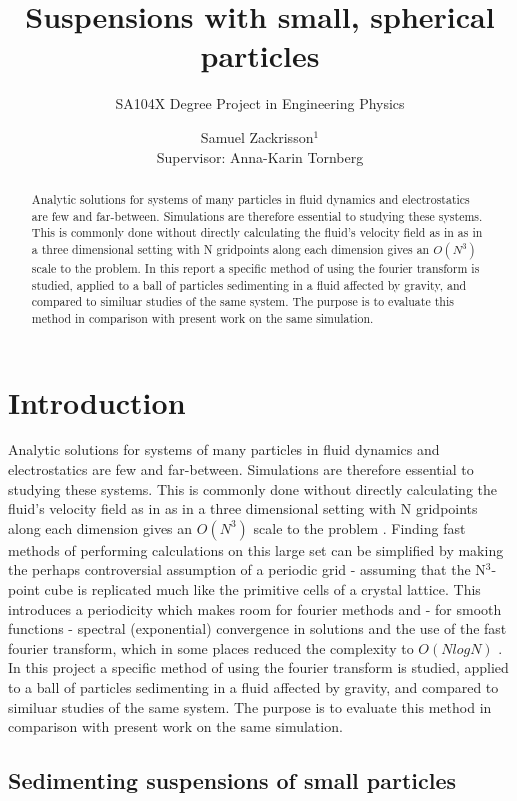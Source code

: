 \documentclass[a4paper,twoside=false,abstract=false,numbers=noenddot,
titlepage=false,headings=small,parskip=half,version=last]{scrartcl}
\title{Suspensions with small, spherical particles}
\subtitle{SA104X Degree Project in Engineering Physics}
\author[2]{Samuel Zackrisson$^1$ \\ \footnotesize Supervisor: Anna-Karin Tornberg}
\affil[1,2]{Department for Numerical Analysis, Royal Institute of Technology}
\affil[1]{samuelz@kth.se}
\affil[2]{akto@kth.se}
\begin{document}
\maketitle
\thispagestyle{empty}

\begin{abstract}
Analytic solutions for systems of many particles in fluid dynamics and electrostatics are few and far-between. Simulations are therefore essential to studying these systems. This is commonly done without directly calculating the fluid's velocity field as in as in a three dimensional setting with N gridpoints along each dimension gives an $O(N^3)$ scale to the problem. In this report a specific method of using the fourier transform is studied, applied to a ball of particles sedimenting in a fluid affected by gravity, and compared to similuar studies of the same system. The purpose is to evaluate this method in comparison with present work on the same simulation.
\end{abstract}

\tableofcontents

\section{Introduction}
Analytic solutions for systems of many particles in fluid dynamics and electrostatics are few and far-between. Simulations are therefore essential to studying these systems. This is commonly done without directly calculating the fluid's velocity field as in as in a three dimensional setting with N gridpoints along each dimension gives an $O(N^3)$ scale to the problem \cite{fallingclouds}. Finding fast methods of performing calculations on this large set can be simplified by making the perhaps controversial assumption of a periodic grid - assuming that the N$^3$-point cube is replicated much like the primitive cells of a crystal lattice. This introduces a periodicity which makes room for fourier methods and - for smooth functions - spectral (exponential) convergence in solutions and the use of the fast fourier transform, which in some places reduced the complexity to $O(NlogN)$ \cite{fluctuatesediment}. In this project a specific method of using the fourier transform is studied, applied to a ball of particles sedimenting in a fluid affected by gravity, and compared to similuar studies of the same system. The purpose is to evaluate this method in comparison with present work on the same simulation.

\subsection{Sedimenting suspensions of small particles}
\end{document}
